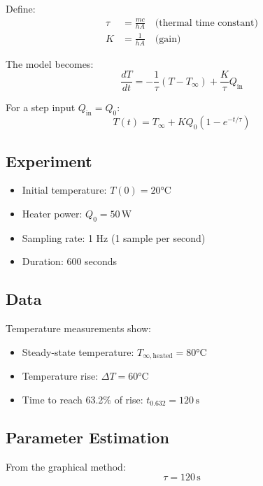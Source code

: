 Define:
\begin{align}
\tau &= \frac{mc}{hA} \quad \text{(thermal time constant)} \\
K &= \frac{1}{hA} \quad \text{(gain)}
\end{align}

The model becomes:
\begin{equation}
\frac{dT}{dt} = -\frac{1}{\tau}(T - T_{\infty}) + \frac{K}{\tau}Q_{\text{in}}
\end{equation}

For a step input $Q_{\text{in}} = Q_0$:
\begin{equation}
T(t) = T_{\infty} + KQ_0(1 - e^{-t/\tau})
\end{equation}

\subsection{Experiment}

\begin{itemize}
    \item Initial temperature: $T(0) = 20°\text{C}$
    \item Heater power: $Q_0 = 50 \, \text{W}$
    \item Sampling rate: 1 Hz (1 sample per second)
    \item Duration: 600 seconds
\end{itemize}

\subsection{Data}

Temperature measurements show:
\begin{itemize}
    \item Steady-state temperature: $T_{\infty, \text{heated}} = 80°\text{C}$
    \item Temperature rise: $\Delta T = 60°\text{C}$
    \item Time to reach 63.2\% of rise: $t_{0.632} = 120 \, \text{s}$
\end{itemize}

\subsection{Parameter Estimation}

From the graphical method:
\begin{equation}
\tau = 120 \, \text{s}
\end{equation}

